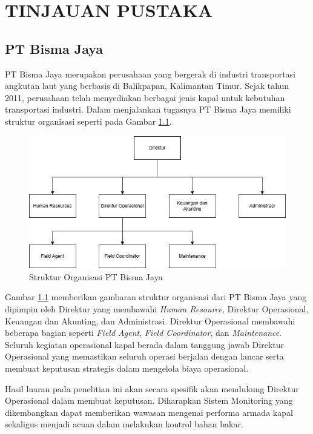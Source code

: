 \chapter{TINJAUAN PUSTAKA}\label{ch:2}

\section{PT Bisma Jaya}

PT Bisma Jaya merupakan perusahaan yang bergerak di industri transportasi angkutan laut yang berbasis di Balikpapan, Kalimantan Timur. Sejak tahun 2011, perusahaan telah menyediakan berbagai jenis kapal untuk kebutuhan transportasi industri. Dalam menjalankan tugasnya PT Bisma Jaya memiliki struktur organisasi seperti pada Gambar \ref{fig:org-structure}.

\begin{figure}[!h]
    \includegraphics[width=1\linewidth, center]{images/tinjauan-pustaka/fig-org-structure.jpg}
    \caption{Struktur Organisasi PT Bisma Jaya}
    \label{fig:org-structure}
\end{figure}

Gambar \ref{fig:org-structure} memberikan gambaran struktur organisasi dari PT Bisma Jaya yang dipimpin oleh Direktur yang membawahi \textit{Human Resource}, Direktur Operasional, Keuangan dan Akunting, dan Administrasi. Direktur Operasional membawahi beberapa bagian seperti \textit{Field Agent}, \textit{Field Coordinator}, dan \textit{Maintenance}. Seluruh kegiatan operasional kapal berada dalam tanggung jawab Direktur Operasional yang memastikan seluruh operasi berjalan dengan lancar serta membuat keputusan strategis dalam mengelola biaya operasional.

Hasil luaran pada penelitian ini akan secara spesifik akan mendukung Direktur Operasional dalam membuat keputusan. Diharapkan Sistem Monitoring yang dikembangkan dapat memberikan wawasan mengenai performa armada kapal sekaligus menjadi acuan dalam melakukan kontrol bahan bakar.


